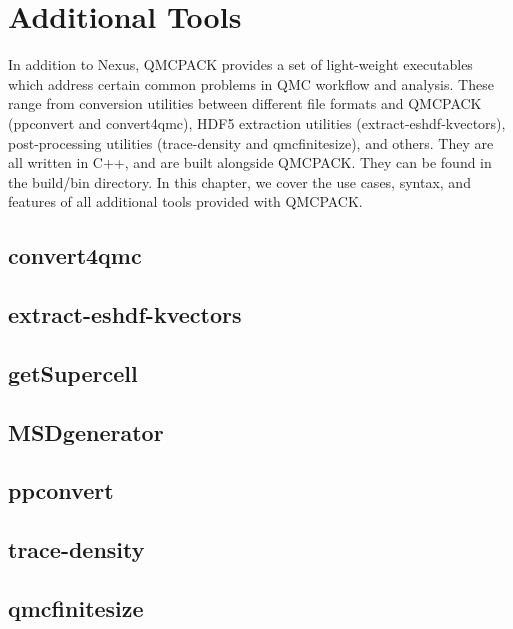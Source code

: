 \chapter{Additional Tools}
\label{chap:additional_tools}
In addition to Nexus, QMCPACK provides a set of light-weight executables which address certain
common problems in QMC workflow and analysis.  These range from conversion utilities between 
different file formats and QMCPACK (ppconvert and convert4qmc), HDF5 extraction utilities 
(extract-eshdf-kvectors), post-processing utilities (trace-density and qmcfinitesize), and others.  They are all written in C++, and are built alongside QMCPACK.  They can be found in the build/bin directory.  In this chapter, we cover the use cases, syntax, and features of all additional tools provided with QMCPACK.  
   
\section{convert4qmc}
\section{extract-eshdf-kvectors}
\section{getSupercell}
\section{MSDgenerator}
\section{ppconvert}
\section{trace-density}
\section{qmcfinitesize}


